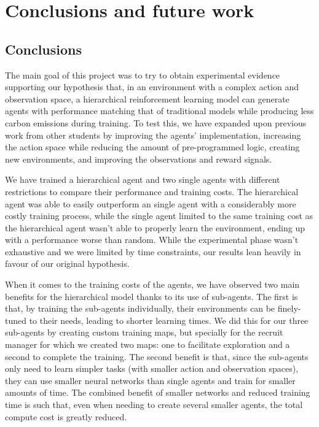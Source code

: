 \chapter{Conclusions and future work}
\label{chapter:conclusions}

\section{Conclusions}

The main goal of this project was to try to obtain experimental evidence supporting our hypothesis that, in an environment with a complex action and observation space, a hierarchical reinforcement learning model can generate agents with performance matching that of traditional models while producing less carbon emissions during training. To test this, we have expanded upon previous work from other students by improving the agents' implementation, increasing the action space while reducing the amount of pre-programmed logic, creating new environments, and improving the observations and reward signals.

We have trained a hierarchical agent and two single agents with different restrictions to compare their performance and training costs. The hierarchical agent was able to easily outperform an single agent with a considerably more costly training process, while the single agent limited to the same training cost as the hierarchical agent wasn't able to properly learn the environment, ending up with a performance worse than random. While the experimental phase wasn't exhaustive and we were limited by time constraints, our results lean heavily in favour of our original hypothesis.

When it comes to the training costs of the agents, we have observed two main benefits for the hierarchical model thanks to its use of sub-agents. The first is that, by training the sub-agents individually, their environments can be finely-tuned to their needs, leading to shorter learning times. We did this for our three sub-agents by creating custom training maps, but specially for the recruit manager for which we created two maps: one to facilitate exploration and a second to complete the training. The second benefit is that, since the sub-agents only need to learn simpler tasks (with smaller action and observation spaces), they can use smaller neural networks than single agents and train for smaller amounts of time. The combined benefit of smaller networks and reduced training time is such that, even when needing to create several smaller agents, the total compute cost is greatly reduced.

